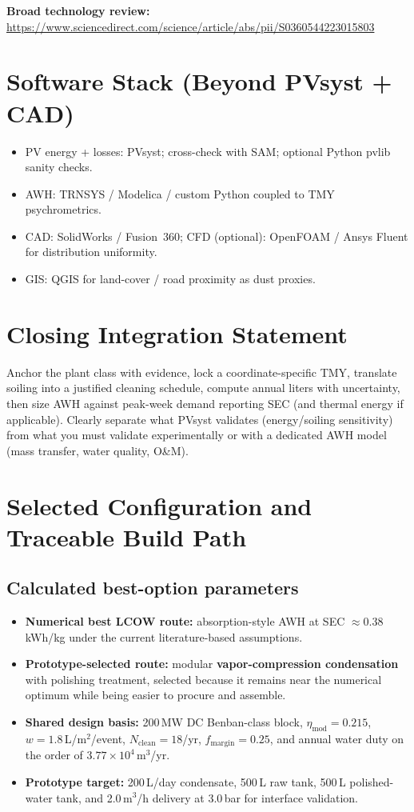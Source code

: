 \documentclass[11pt,a4paper]{article}
\begin{document}
\textbf{Broad technology review:}\\
\url{https://www.sciencedirect.com/science/article/abs/pii/S0360544223015803}

\section{Software Stack (Beyond PVsyst + CAD)}
\begin{itemize}[leftmargin=*]
  \item PV energy + losses: PVsyst; cross-check with SAM; optional Python pvlib sanity checks.
  \item AWH: TRNSYS / Modelica / custom Python coupled to TMY psychrometrics.
  \item CAD: SolidWorks / Fusion~360; CFD (optional): OpenFOAM / Ansys Fluent for distribution uniformity.
  \item GIS: QGIS for land-cover / road proximity as dust proxies.
\end{itemize}

\section{Closing Integration Statement}
Anchor the plant class with evidence, lock a coordinate-specific TMY, translate soiling into a justified cleaning schedule, compute annual liters with uncertainty, then size AWH against peak-week demand reporting SEC (and thermal energy if applicable). Clearly separate what PVsyst validates (energy/soiling sensitivity) from what you must validate experimentally or with a dedicated AWH model (mass transfer, water quality, O\&M).

\section{Selected Configuration and Traceable Build Path}
\subsection{Calculated best-option parameters}
\begin{itemize}[leftmargin=*]
  \item \textbf{Numerical best LCOW route:} absorption-style AWH at SEC $\approx 0.38$\,kWh/kg under the current literature-based assumptions.
  \item \textbf{Prototype-selected route:} modular \textbf{vapor-compression condensation} with polishing treatment, selected because it remains near the numerical optimum while being easier to procure and assemble.
  \item \textbf{Shared design basis:} 200\,MW DC Benban-class block, $\eta_{\mathrm{mod}}=0.215$, $w=1.8$\,L/m$^2$/event, $N_{\mathrm{clean}}=18$/yr, $f_{\mathrm{margin}}=0.25$, and annual water duty on the order of $3.77\times 10^4$\,m$^3$/yr.
  \item \textbf{Prototype target:} 200\,L/day condensate, 500\,L raw tank, 500\,L polished-water tank, and 2.0\,m$^3$/h delivery at 3.0\,bar for interface validation.
\end{itemize}
\end{document}
